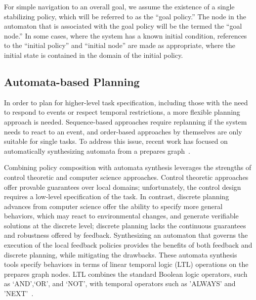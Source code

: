 For simple navigation to an overall goal, we assume the existence of a
single stabilizing policy, which will be referred to as the ``goal
policy.''  The node in the automaton that is associated with the goal
policy will be the termed the ``goal node.''  In some cases, where the
system has a known initial condition, references to the ``initial
policy'' and ``initial node'' are made as appropriate, where the
initial state is contained in the domain of the initial policy.

\subsection{Automata-based Planning}
\label{sec:automata}

In order to plan for higher-level task specification, including those
with the need to respond to events or respect temporal restrictions, a
more flexible planning approach is needed.  Sequence-based approaches
require replanning if the system needs to react to an event, and
order-based approaches by themselves are only suitable for single
tasks.  To address this issue, recent work has focused on
automatically synthesizing automata from a prepares
graph~\cite{belta_06,hadas_07}.

Combining policy composition with automata synthesis leverages the strengths of
control theoretic and computer science approaches.  Control theoretic approaches
offer provable guarantees over local domains; unfortunately, the control design
requires a low-level specification of the task.  In contrast, discrete planning
advances from computer science offer the ability to specify more general behaviors,
which may react to environmental changes, and generate verifiable solutions at the
discrete level; discrete planning lacks the continuous guarantees and robustness
offered by feedback.  Synthesizing an automaton that governs the execution of the
local feedback policies provides the benefits of both feedback and discrete planning,
while mitigating the drawbacks.  These automata synthesis tools specify behaviors in
terms of linear temporal logic (LTL) operations on the prepares graph nodes.  LTL
combines the standard Boolean logic operators, such as `AND',`OR', and `NOT', with
temporal operators such as 'ALWAYS' and 'NEXT'~\cite{Emerson}.

